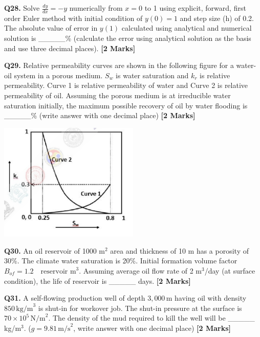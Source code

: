 \documentclass[11pt]{article}
\newcommand{\questionb}[2]{
    \noindent\textbf{Q#2.} #1 \hfill \textbf{[2 Marks]}
}
\begin{document}
\questionb{Solve \(\frac{dy}{dx} = -y\) numerically from \(x = 0\) to 1 using explicit, forward, first order Euler method with initial condition of \(y(0) = 1\) and step size (h) of 0.2. The absolute value of error in \(y(1)\) calculated using analytical and numerical solution is \_\_\_\_\_\% (calculate the error using analytical solution as the basis and use three decimal places).}{28}
\vspace{0.5cm}

\questionb{Relative permeability curves are shown in the following figure for a water-oil system in a porous medium. \(S_w\) is water saturation and \(k_r\) is relative permeability. Curve 1 is relative permeability of water and Curve 2 is relative permeability of oil. Assuming the porous medium is at irreducible water saturation initially, the maximum possible recovery of oil by water flooding is \_\_\_\_\_\% (write answer with one decimal place)}{29}
\begin{center}
\includegraphics[width=0.5\textwidth]{figures/29.png}
\end{center}
\vspace{0.5cm}

\questionb{An oil reservoir of 1000 m\(^2\) area and thickness of 10 m has a porosity of 30\%. The climate water saturation is 20\%. Initial formation volume factor \(B_{of} = 1.2 \quad \text{reservoir m}^3\). Assuming average oil flow rate of 2 m\(^3\)/day (at surface condition), the life of reservoir is \_\_\_\_\_ days.}{30}
\vspace{0.5cm}

\questionb{A self-flowing production well of depth \(3,000 \, \text{m}\) having oil with density \(850 \, \text{kg/m}^3\) is shut-in for workover job. The shut-in pressure at the surface is \(70 \times 10^5 \, \text{N/m}^2\). The density of the mud required to kill the well will be \_\_\_\_\_ kg/m\(^3\). (\(g = 9.81 \, \text{m/s}^2\), write answer with one decimal place)}{31}
\vspace{0.5cm}
\end{document}
